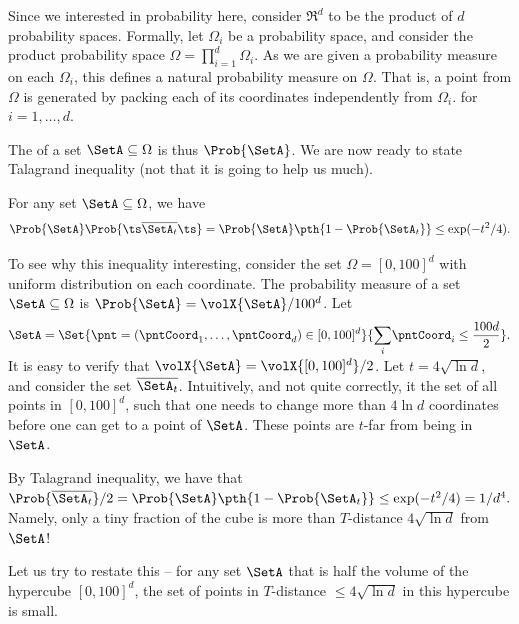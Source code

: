 Since we interested in probability here, consider $\Re^d$ to be the
product of $d$ probability spaces. Formally, let $\Omega_i$ be a
probability space, and consider the product probability space
$\Omega = \prod_{i=1}^d \Omega_i$. As we are given a probability
measure on each $\Omega_i$, this defines a natural probability measure
on $\Omega$. That is, a point from $\Omega$ is generated by packing
each of its coordinates independently from $\Omega_i$. for
$i=1,\ldots, d$.

The  of a set $\SetA \subseteq \Omega$ is thus
$\Prob{\SetA}$. We are now ready to state Talagrand inequality (not
that it is going to help us much).

\newcommand{\TalagrandBody}{%
    X }%

\begin{theorem}
    For any set $\SetA \subseteq \Omega$, we have
    \begin{equation*}
        \Prob{\SetA}\Prob{ \ts \smash{\overline{\SetA_t}}\ts }%
        =%
        \Prob{\SetA}\pth{\bigl. 1 - \Prob{ \SetA_t} } \leq %
        \exp( -t^2 /4).
    \end{equation*}%
\end{theorem}

\begin{example}
    To see why this inequality interesting, consider the set
    $\Omega = [0,100]^d$ with uniform distribution on each
    coordinate. The probability measure of a set $\SetA \subseteq \Omega$ is
    $\Prob{\SetA} = \volX{\SetA} / 100^d$. Let
    \begin{equation*}
        \SetA = \Set{ \pnt =(\pntCoord_1, \ldots, \pntCoord_d) \in
           [0,100]^d}%
        {\smash{\sum_i} \Bigl. \pntCoord_i \leq \frac{100d}{2}}.
    \end{equation*}
    It is easy to verify that $\volX{\SetA} = \volX{[0,100]^d}/2$.
    Let $t= 4\sqrt{\ln d}$, and consider the set
    $\overline{\SetA_t}$. Intuitively, and not quite correctly, it the
    set of all points in $[0,100]^d$, such that one needs to change
    more than $4 \ln d$ coordinates before one can get to a point of
    $\SetA$. These points are $t$-far from being in $\SetA$.

    By Talagrand inequality, we have that 
    \begin{math}
        {\Prob{\overline{\SetA_t}}}/{2}%
        =%
        \Prob{\SetA}\pth{\bigl. 1 - \Prob{ \SetA_t} }%
        \leq %
        \exp( -t^2 /4)%
        =%
        1/d^4.
    \end{math}
    Namely, only a tiny fraction of the cube is more than $T$-distance
    $4 \sqrt{\ln d}$ from $\SetA$!

    Let us try to restate this -- for any set $\SetA$ that is half the
    volume of the hypercube $[0,100]^d$, the set of points in
    $T$-distance $\leq 4 \sqrt{\ln d}$ in this hypercube is small.
\end{example}


